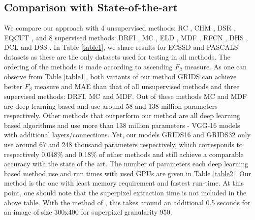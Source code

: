 \documentclass[a4paper,conference]{IEEEtran}
\begin{document}
\subsection{Comparison with State-of-the-art}
We compare our approach with 4 unsupervised methods: RC \cite{Cheng1}, CHM \cite{Li3}, DSR \cite{Li2}, EQCUT \cite{Aytekin2}, and 8 supervised methods: DRFI \cite{Jiang}, MC \cite{Zhao}, ELD \cite{Gayoung}, MDF \cite{Li4}, RFCN \cite{Wang}, DHS \cite{Liu2}, DCL \cite{Li5} and DSS \cite{Hou}. 
In Table \ref{table1}, we share results for ECSSD and PASCALS datasets as these are the only datasets used for testing in all methods. 
The ordering of the methods is made according to ascending $F_\beta$ measure.
As one can observe from Table \ref{table1}, both variants of our method GRIDS can achieve better $F_\beta$ measure and MAE than that of all unsupervised methods and three supervised methods: DRFI, MC and MDF. 
Out of these methods MC and MDF are deep learning based and use around 58 and 138 million parameters respectively. 
Other methods that outperform our method are all deep learning based algorithms and use more than 138 million parameters - VGG-16 models with additional layers/connections. 
Yet, our models GRIDS16 and GRIDS32 only use around 67 and 248 thousand parameters respectively, which corresponds to respectively 0.048\% and 0.18\% of other methods and still achieve a comparable accuracy with the state of the art. 
The number of parameters each deep learning based method use and run times with used GPUs are given in Table \ref{table2}. 
Our method is the one with least memory requirement and fastest run-time. 
At this point, one should note that the superpixel extraction time is not included in the above table. With the method of \cite{Fu}, this takes around an additional 0.5 seconds for an image of size 300x400 for superpixel granularity 950.
\end{document}
